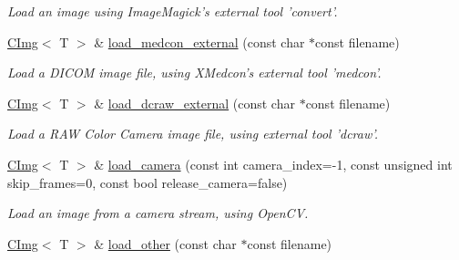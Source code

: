 \begin{DoxyCompactItemize}
\begin{DoxyCompactList}\small\item\em Load an image using ImageMagick's external tool 'convert'. \item\end{DoxyCompactList}\item 
\hypertarget{structcimg__library_1_1CImg_a38df90ee1c431b684fcb5ed8248464b1}{
\hyperlink{structcimg__library_1_1CImg}{CImg}$<$ T $>$ \& \hyperlink{structcimg__library_1_1CImg_a38df90ee1c431b684fcb5ed8248464b1}{load\_\-medcon\_\-external} (const char $\ast$const filename)}
\label{structcimg__library_1_1CImg_a38df90ee1c431b684fcb5ed8248464b1}

\begin{DoxyCompactList}\small\item\em Load a DICOM image file, using XMedcon's external tool 'medcon'. \item\end{DoxyCompactList}\item 
\hypertarget{structcimg__library_1_1CImg_a67cf88da9c1122b55ebcef3d223bccbe}{
\hyperlink{structcimg__library_1_1CImg}{CImg}$<$ T $>$ \& \hyperlink{structcimg__library_1_1CImg_a67cf88da9c1122b55ebcef3d223bccbe}{load\_\-dcraw\_\-external} (const char $\ast$const filename)}
\label{structcimg__library_1_1CImg_a67cf88da9c1122b55ebcef3d223bccbe}

\begin{DoxyCompactList}\small\item\em Load a RAW Color Camera image file, using external tool 'dcraw'. \item\end{DoxyCompactList}\item 
\hypertarget{structcimg__library_1_1CImg_ace34b872d377bb564d2bb59b51b638ec}{
\hyperlink{structcimg__library_1_1CImg}{CImg}$<$ T $>$ \& \hyperlink{structcimg__library_1_1CImg_ace34b872d377bb564d2bb59b51b638ec}{load\_\-camera} (const int camera\_\-index=-\/1, const unsigned int skip\_\-frames=0, const bool release\_\-camera=false)}
\label{structcimg__library_1_1CImg_ace34b872d377bb564d2bb59b51b638ec}

\begin{DoxyCompactList}\small\item\em Load an image from a camera stream, using OpenCV. \item\end{DoxyCompactList}\item 
\hypertarget{structcimg__library_1_1CImg_a35a909fb3df4bd76be2facc8366861af}{
\hyperlink{structcimg__library_1_1CImg}{CImg}$<$ T $>$ \& \hyperlink{structcimg__library_1_1CImg_a35a909fb3df4bd76be2facc8366861af}{load\_\-other} (const char $\ast$const filename)}
\label{structcimg__library_1_1CImg_a35a909fb3df4bd76be2facc8366861af}


\end{DoxyCompactItemize}
